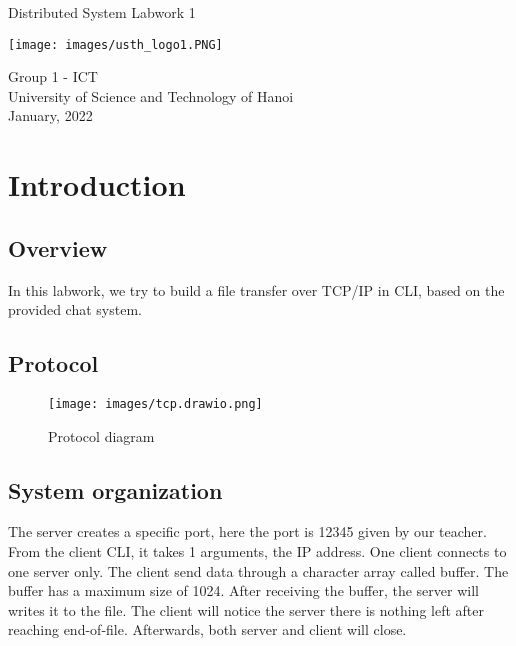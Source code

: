 \documentclass[13pt]{article}
\begin{document}
\begin{titlepage}
    \begin{center}
        \vspace*{1.8cm}
        \Large
        Distributed System Labwork 1\\
        \Large
        \vspace{0.5cm}
        \begin{center}
            \texttt{[image: images/usth\_logo1.PNG]}
        \end{center}  
        \vspace{0.5cm}
            Group 1 - ICT\\
        \vspace{0.5cm}
            University of Science and Technology of Hanoi\\
        \vspace{0.5cm}
            January, 2022
        \vfill
          
   \end{center}
\end{titlepage}

\newpage
\tableofcontents
\newpage

\section{Introduction}
\subsection{Overview}
\noindent%
In this labwork, we try to build a file transfer over TCP/IP in CLI, based on the
provided chat system.

\subsection{Protocol}

\begin{figure}[h]
    \centering
    \texttt{[image: images/tcp.drawio.png]}
    \caption{Protocol diagram}
    \label{fig:protocol}
\end{figure}

\subsection{System organization}
\noindent%
The server creates a specific port, here the port is 12345 given by our teacher. From the client CLI, it takes 1 arguments, the IP address. One client connects to one server only. The client send data through a character array called buffer. The buffer has a maximum size of 1024. After receiving the buffer, the server will writes it to the file. The client will notice the server there is nothing left after reaching end-of-file. Afterwards, both server and client will close.
\end{document}

